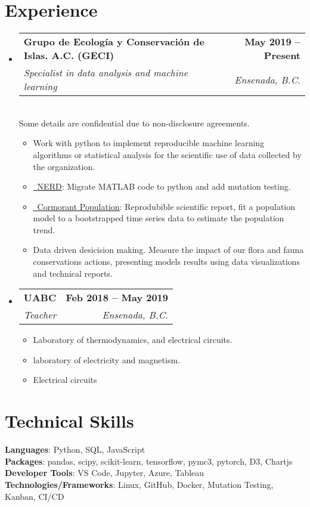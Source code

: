 \documentclass[letterpaper,11pt]{article}
\makeatletter
\newcommand{\resumeItem}[1]{
  \item\small{
    {#1 \vspace{-2pt}}
  }
}
\newcommand{\resumeSubheading}[4]{
  \vspace{-2pt}\item
    \begin{tabular*}{1.0\textwidth}[t]{l@{\extracolsep{\fill}}r}
      \textbf{#1} & \textbf{\small #2} \\
      \textit{\small#3} & \textit{\small #4} \\
    \end{tabular*}\vspace{-7pt}
}
\newcommand{\resumeSubHeadingListStart}{\begin{itemize}[leftmargin=0.0in, label={}]}
\newcommand{\resumeSubHeadingListEnd}{\end{itemize}}
\newcommand{\resumeItemListStart}{\begin{itemize}}
\newcommand{\resumeItemListEnd}{\end{itemize}\vspace{-5pt}}
\makeatother
\begin{document}
\section{Experience}
  \resumeSubHeadingListStart

    \resumeSubheading
      {Grupo de Ecología y Conservación de Islas. A.C. (GECI)}{May 2019 -- Present}
      {Specialist in data analysis and machine learning}{Ensenada, B.C.}\\ \vspace{7pt}
      \small Some details are confidential due to non-disclosure agreements.
      \resumeItemListStart
        \resumeItem{Work with python to implement reproducible machine learning algorithms or statistical analysis for the scientific use of data collected by the organization.}
        \resumeItem{\href{https://github.com/IslasGECI/nerd}{\raisebox{-0.2\height}\faGithub\ \underline{NERD}}: Migrate MATLAB code to python and add mutation testing.}
        \resumeItem{\href{https://github.com/IslasGECI/cormorant_population_growth}{\raisebox{-0.2\height}\faGithub\ \underline{Cormorant Population}}: Reprodubible scientific report, fit a population model to a bootstrapped time series data to estimate the population trend.}
        \resumeItem{Data driven desicision making. Measure the impact of our flora and fauna conservations actions, presenting models results using data visualizations and technical reports.}

      \resumeItemListEnd

    \resumeSubheading
      {UABC}{Feb 2018 -- May 2019}
      {Teacher}{Ensenada, B.C.} \vspace{3pt}
      \resumeItemListStart Courses:
        \resumeItem{Laboratory of thermodynamics,  and electrical circuits.}
        \resumeItem{laboratory of electricity and magnetism.}
        \resumeItem{Electrical circuits}
    \resumeItemListEnd
    
  \resumeSubHeadingListEnd
\vspace{-16pt}

\section{Technical Skills}
 \begin{itemize}[leftmargin=0.15in, label={}]
    \small{\item{
     \textbf{Languages}{: Python, SQL, JavaScript} \\
     \textbf{Packages}{: pandas, scipy, scikit-learn, tensorflow, pymc3, pytorch, D3, Chartjs} \\
     \textbf{Developer Tools}{: VS Code, Jupyter, Azure, Tableau} \\
     \textbf{Technologies/Frameworks}{: Linux, GitHub, Docker, Mutation Testing, Kanban, CI/CD} \\
    }}
 \end{itemize}
 \vspace{-16pt}
\end{document}
